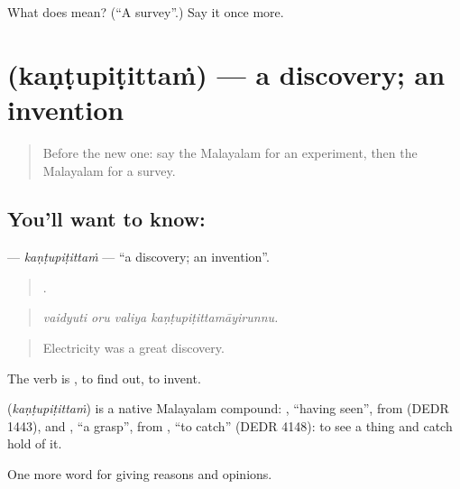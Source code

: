 \begin{tcolorbox}[breakable,colback=teal!4,colframe=teal!35!black,title={Before you move on}]
What does  mean? (\textquotedblleft{}A survey\textquotedblright{}.) Say it once more.
\end{tcolorbox}
\section[\texorpdfstring{\ml{കണ്ടുപിടിത്തം} (kaṇṭupiṭittaṁ)}{കണ്ടുപിടിത്തം (kaṇṭupiṭittaṁ)}]{ (kaṇṭupiṭittaṁ) — a discovery; an invention}

\label{lesson:ML-C436-kantupitittam}



\begin{quote}
Before the new one: say the Malayalam for an experiment, then the Malayalam for a survey.
\end{quote}

\subsection*{You'll want to know: }
\textbf{} — \emph{kaṇṭupiṭittaṁ} — \textquotedblleft{}a discovery; an invention\textquotedblright{}.

\begin{quote}
   .
\end{quote}

\begin{quote}
\emph{vaidyuti oru valiya kaṇṭupiṭittamāyirunnu.}
\end{quote}

\begin{quote}
Electricity was a great discovery.
\end{quote}

The verb is , to find out, to invent.

\begin{cousinweb}
\textbf{} (\emph{kaṇṭupiṭittaṁ}) is a native Malayalam compound: , \textquotedblleft{}having seen\textquotedblright{}, from  (DEDR 1443), and , \textquotedblleft{}a grasp\textquotedblright{}, from , \textquotedblleft{}to catch\textquotedblright{} (DEDR 4148): to see a thing and catch hold of it.
\end{cousinweb}

\begin{grammarlens}[title={What you've built}]
One more word for giving reasons and opinions.
\end{grammarlens}


